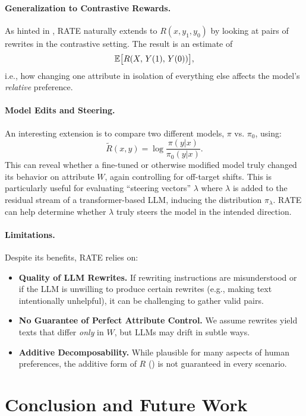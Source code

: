 \paragraph{Generalization to Contrastive Rewards.}
As hinted in , RATE naturally extends to $R(x, y_1, y_0)$ by looking at pairs of rewrites in the contrastive setting. The result is an estimate of
\[
\mathbb{E}\bigl[R(X,\,Y(1),\,Y(0))\bigr],
\]
i.e., how changing one attribute in isolation of everything else affects the model's \emph{relative} preference.

\paragraph{Model Edits and Steering.}
An interesting extension is to compare two different models, $\pi$ vs. $\pi_0$, using:
\[
\tilde{R}(x,y) = \log\frac{\pi(y|x)}{\pi_0(y|x)}.
\]
This can reveal whether a fine-tuned or otherwise modified model truly changed its behavior on attribute $W$, again controlling for off-target shifts. This is particularly useful for evaluating ``steering vectors'' $\lambda$ where $\lambda$ is added to the residual stream of a transformer-based LLM, inducing the distribution $\pi_\lambda$. RATE can help determine whether $\lambda$ truly steers the model in the intended direction.

\paragraph{Limitations.}
Despite its benefits, RATE relies on:
\begin{itemize}
    \item \textbf{Quality of LLM Rewrites.} If rewriting instructions are misunderstood or if the LLM is unwilling to produce certain rewrites (e.g., making text intentionally unhelpful), it can be challenging to gather valid pairs.
    \item \textbf{No Guarantee of Perfect Attribute Control.} We assume rewrites yield texts that differ \emph{only} in $W$, but LLMs may drift in subtle ways.
    \item \textbf{Additive Decomposability.} While plausible for many aspects of human preferences, the additive form of $R$ () is not guaranteed in every scenario.
\end{itemize}

\section{Conclusion and Future Work}
\label{sec:conclusion}

